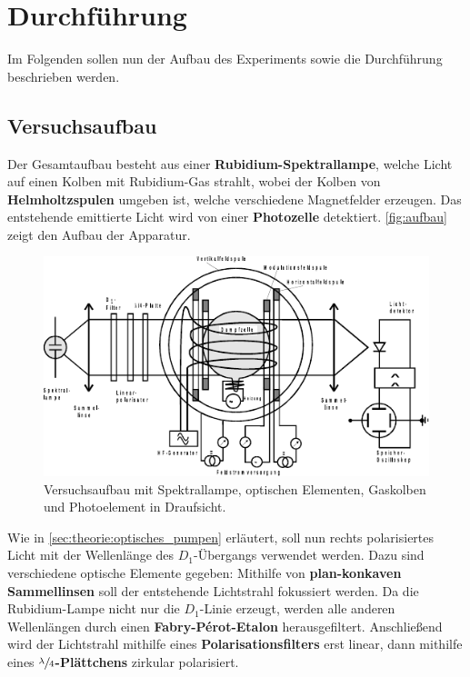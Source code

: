 \section{Durchführung}
\label{sec:durchfuehrung}

    Im Folgenden sollen nun der Aufbau des Experiments sowie die Durchführung beschrieben werden.

\subsection{Versuchsaufbau}

    Der Gesamtaufbau besteht aus einer \textbf{Rubidium-Spektrallampe},
    welche Licht auf einen Kolben mit Rubidium-Gas strahlt,
    wobei der Kolben von \textbf{Helmholtzspulen} umgeben ist,
    welche verschiedene Magnetfelder erzeugen.
    Das entstehende emittierte Licht wird von einer \textbf{Photozelle} detektiert.
    \autoref{fig:aufbau} zeigt den Aufbau der Apparatur.
    \begin{figure}
        \centering
        \includegraphics[width=\textwidth]{content/img/Abb_1.pdf}
        \caption{Versuchsaufbau mit Spektrallampe, optischen Elementen, Gaskolben und Photoelement in Draufsicht. \cite{versuchsanleitung}}
        \label{fig:aufbau}
    \end{figure}

    Wie in \autoref{sec:theorie:optisches_pumpen} erläutert,
    soll nun rechts polarisiertes Licht mit der Wellenlänge des $D_1$-Übergangs verwendet werden.
    Dazu sind verschiedene optische Elemente gegeben:
    Mithilfe von \textbf{plan-konkaven Sammellinsen} soll der entstehende Lichtstrahl fokussiert werden.
    Da die Rubidium-Lampe nicht nur die $D_1$-Linie erzeugt,
    werden alle anderen Wellenlängen durch einen \textbf{Fabry-Pérot-Etalon} herausgefiltert.
    Anschließend wird der Lichtstrahl mithilfe eines \textbf{Polarisationsfilters} erst linear,
    dann mithilfe eines \textbf{$\sfrac{\lambda}{4}$-Plättchens} zirkular polarisiert.

